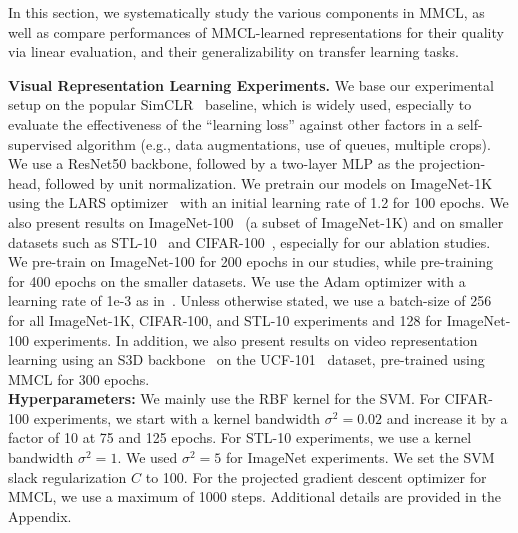 \documentclass[letterpaper]{article} \usepackage{aaai22}  \usepackage{times}  \usepackage{helvet}  \usepackage{courier}  \usepackage[hyphens]{url}  \usepackage{graphicx} \urlstyle{rm} \def\UrlFont{\rm}  \usepackage{natbib}  \usepackage{caption} \DeclareCaptionStyle{ruled}{labelfont=normalfont,labelsep=colon,strut=off} \frenchspacing  \setlength{\pdfpagewidth}{8.5in}  \setlength{\pdfpageheight}{11in}
\begin{document}
In this section, we systematically study the various components in MMCL, as well as compare performances of MMCL-learned representations for their quality via linear evaluation, and their generalizability on transfer learning tasks.

\noindent \textbf{Visual Representation Learning Experiments.} We base our experimental setup on the popular SimCLR~\cite{chen2020simple} baseline, which is widely used, especially to evaluate the effectiveness of the ``learning loss'' against other factors in a self-supervised algorithm (e.g., data augmentations, use of queues, multiple crops).
We use a ResNet50 backbone, followed by a two-layer MLP as the projection-head, followed by unit normalization. We pretrain our models on ImageNet-1K~\cite{deng2009imagenet} using the LARS optimizer~\cite{you2017large} with an initial learning rate of 1.2 for 100 epochs. We also present results on ImageNet-100~\cite{tian2019contrastive} (a subset of ImageNet-1K) and on smaller datasets such as STL-10~\cite{coates2011analysis} and CIFAR-100~\cite{krizhevsky2009learning}, especially for our ablation studies. We pre-train on ImageNet-100 for 200 epochs in our studies, while pre-training for 400 epochs on the smaller datasets. We use the Adam optimizer with a learning rate of 1e-3 as in~\cite{chuang2020debiased,robinson2021contrastive}. Unless otherwise stated, we use a batch-size of 256 for all ImageNet-1K, CIFAR-100, and STL-10 experiments and 128 for ImageNet-100 experiments. In addition, we also present results on video representation learning using an S3D backbone~\cite{Xie2018RethinkingSF} on the UCF-101~\cite{soomro2012ucf101} dataset, pre-trained using MMCL for 300 epochs. 
\\
\noindent\textbf{Hyperparameters:} 
We mainly use the RBF kernel for the SVM. For CIFAR-100 experiments, we start with a kernel bandwidth $\sigma^2=0.02$ and increase it by a factor of 10 at 75 and 125 epochs. For STL-10 experiments, we use a kernel bandwidth $\sigma^2=1$. We used $\sigma^2=5$ for ImageNet experiments. 
We set the SVM slack regularization $C$ to 100.  For the projected gradient descent optimizer for MMCL, we use a maximum of 1000 steps. Additional details are provided in the Appendix.
\end{document}
